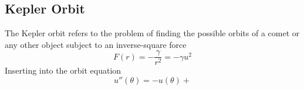 \documentclass[../../../main.tex]{subfiles}
\begin{document}
\subsection{Kepler Orbit}
The Kepler orbit refers to the problem of finding the possible orbits of a comet or any other object subject to an inverse-square force
\begin{equation*}
    F(r)=-\frac{\gamma }{r^2}=-\gamma u^2
\end{equation*}
Inserting into the orbit equation
\begin{equation*}
    u''(\theta)=-u(\theta)+
\end{equation*}
\end{document}
